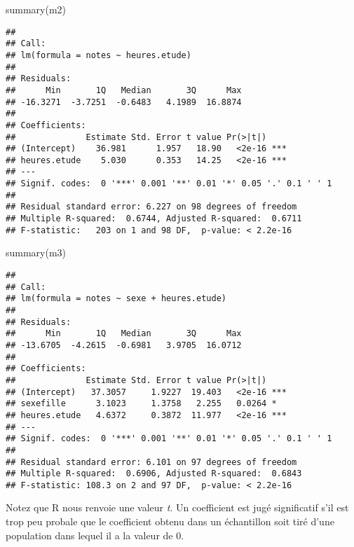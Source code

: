 \documentclass[
]{book}
\newenvironment{Shaded}{\begin{snugshade}}{\end{snugshade}}
\newcommand{\FunctionTok}[1]{\textcolor[rgb]{0.00,0.00,0.00}{#1}}
\newcommand{\NormalTok}[1]{#1}
\begin{document}
\begin{Shaded}
\begin{Highlighting}[]
\FunctionTok{summary}\NormalTok{(m2)}
\end{Highlighting}
\end{Shaded}

\begin{verbatim}
## 
## Call:
## lm(formula = notes ~ heures.etude)
## 
## Residuals:
##      Min       1Q   Median       3Q      Max 
## -16.3271  -3.7251  -0.6483   4.1989  16.8874 
## 
## Coefficients:
##              Estimate Std. Error t value Pr(>|t|)    
## (Intercept)    36.981      1.957   18.90   <2e-16 ***
## heures.etude    5.030      0.353   14.25   <2e-16 ***
## ---
## Signif. codes:  0 '***' 0.001 '**' 0.01 '*' 0.05 '.' 0.1 ' ' 1
## 
## Residual standard error: 6.227 on 98 degrees of freedom
## Multiple R-squared:  0.6744, Adjusted R-squared:  0.6711 
## F-statistic:   203 on 1 and 98 DF,  p-value: < 2.2e-16
\end{verbatim}

\begin{Shaded}
\begin{Highlighting}[]
\FunctionTok{summary}\NormalTok{(m3)}
\end{Highlighting}
\end{Shaded}

\begin{verbatim}
## 
## Call:
## lm(formula = notes ~ sexe + heures.etude)
## 
## Residuals:
##      Min       1Q   Median       3Q      Max 
## -13.6705  -4.2615  -0.6981   3.9705  16.0712 
## 
## Coefficients:
##              Estimate Std. Error t value Pr(>|t|)    
## (Intercept)   37.3057     1.9227  19.403   <2e-16 ***
## sexefille      3.1023     1.3758   2.255   0.0264 *  
## heures.etude   4.6372     0.3872  11.977   <2e-16 ***
## ---
## Signif. codes:  0 '***' 0.001 '**' 0.01 '*' 0.05 '.' 0.1 ' ' 1
## 
## Residual standard error: 6.101 on 97 degrees of freedom
## Multiple R-squared:  0.6906, Adjusted R-squared:  0.6843 
## F-statistic: 108.3 on 2 and 97 DF,  p-value: < 2.2e-16
\end{verbatim}

Notez que R nous renvoie une valeur \emph{t}. Un coefficient est jugé significatif s'il est trop peu probale que le coefficient obtenu dans un échantillon soit tiré d'une population dans lequel il a la valeur de 0.
\end{document}
